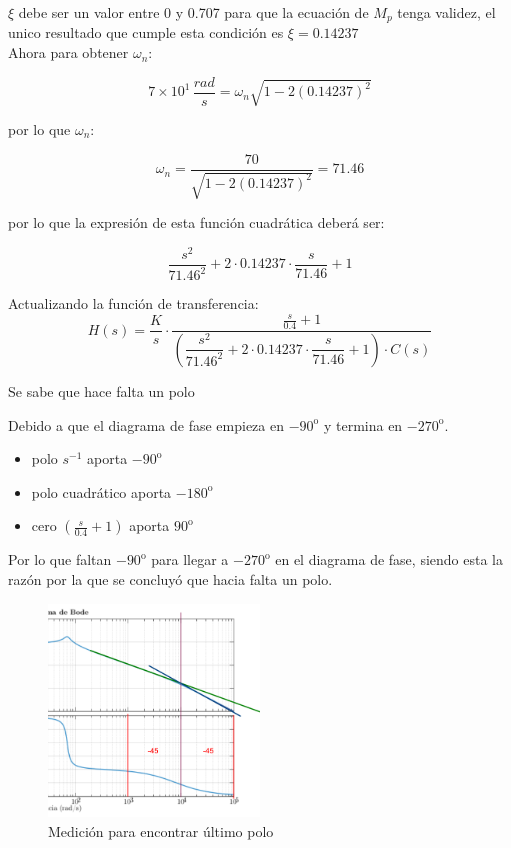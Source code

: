 $\xi$ debe ser un valor entre 0 y 0.707 para que la ecuación de $M_p$
tenga validez, el unico resultado que cumple esta condición es 
$\xi = 0{.}14237$ \\

Ahora para obtener $\omega_n$:

\begin{equation*}
    7\times 10^{1} \, \frac{rad}{s} = \omega_n \sqrt{1 - 2{(0{.}14237)}^2}
\end{equation*}

por lo que $\omega_n$:

\begin{equation*}
    \omega_n  = \dfrac{70}{\sqrt{1 - 2{(0{.}14237)}^2}} = 71{.}46
\end{equation*}

por lo que la expresión de esta función cuadrática deberá ser:

\begin{equation*}
\dfrac{s^2}{71{.}46^2} + 2\cdot 0{.}14237 \cdot \dfrac{s}{71{.}46} + 1 
\end{equation*}

Actualizando la función de transferencia:
\begin{equation*}
    H(s) = \dfrac{K}{s} \cdot \dfrac{\frac{s}{0{.}4} + 1}{
        \left(
            \dfrac{s^2}{71{.}46^2} 
            + 2\cdot 0{.}14237 \cdot
            \dfrac{s}{71{.}46} + 1 
        \right) \cdot C(s)
        }
\end{equation*}

Se sabe que hace falta un polo

Debido a que el diagrama de fase empieza en $-90^{\mathrm{o}}$ y termina en 
$-270^{\mathrm{o}}$.

\begin{itemize}
\item polo $s^{-1}$ aporta $-90^{\mathrm{o}}$ 
\item polo cuadrático aporta $-180^{\mathrm{o}}$ 
\item cero ${(\frac{s}{0{.}4} + 1)}$ aporta $90^{\mathrm{o}}$
\end{itemize}

Por lo que faltan $-90^{\mathrm{o}}$ para llegar a $-270^{\mathrm{o}}$ en el
diagrama de fase, siendo esta la razón por la que se concluyó que hacia falta
un polo. 

\begin{figure}[H]
    \centering
    \includegraphics[width=0.5\textwidth]{imagenes/ultimo_polo.png}
    \caption{
        Medición para encontrar último polo
    }\label{fig:ult_polo}
\end{figure}

